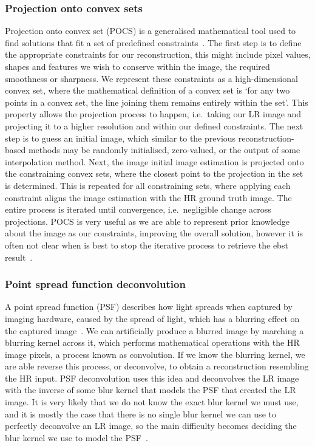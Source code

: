 \subsubsection{Projection onto convex sets}
Projection onto convex set (POCS) is a generalised mathematical tool used to find solutions that fit a set of predefined constraints~\cite{pocs,pocsEndoscopy}. The first step is to define the appropriate constraints for our reconstruction, this might include pixel values, shapes and features we wish to conserve within the image, the required smoothness or sharpness. We represent these constraints as a high-dimensional convex set, where the mathematical definition of a convex set is `for any two points in a convex set, the line joining them remains entirely within the set'. This property allows the projection process to happen, i.e.\ taking our LR image and projecting it to a higher resolution and within our defined constraints. The next step is to guess an initial image, which similar to the previous reconstruction-based methods may be randomly initialised, zero-valued, or the output of some interpolation method. Next, the image initial image estimation is projected onto the constraining convex sets, where the closest point to the projection in the set is determined. This is repeated for all constraining sets, where applying each constraint aligns the image estimation with the HR ground truth image. The entire process is iterated until convergence, i.e.\ negligible change across projections. POCS is very useful as we are able to represent prior knowledge about the image as our constraints, improving the overall solution, however it is often not clear when is best to stop the iterative process to retrieve the ebst result~\cite{pocsEndoscopy}.

\subsubsection{Point spread function deconvolution}
A point spread function (PSF) describes how light spreads when captured by imaging hardware, caused by the spread of light, which has a blurring effect on the captured image~\cite{psfDeconv}. We can artificially produce a blurred image by marching a blurring kernel across it, which performs mathematical operations with the HR image pixels, a process known as convolution. If we know the blurring kernel, we are able reverse this process, or deconvolve, to obtain a reconstruction resembling the HR input. PSF deconvolution uses this idea and deconvolves the LR image with the inverse of some blur kernel that models the PSF that created the LR image. It is very likely that we do not know the exact blur kernel we must use, and it is mostly the case that there is no single blur kernel we can use to perfectly deconvolve an LR image, so the main difficulty becomes deciding the blur kernel we use to model the PSF~\cite{pocs}.

